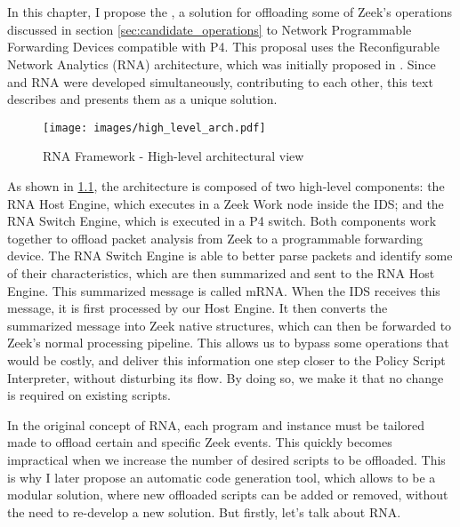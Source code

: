 \chapter{\TheSolutionName{}}
\label{cap:proposal}

In this chapter, I propose the \TheSolutionName{}, a solution for offloading some of Zeek's operations discussed in section \ref{sec:candidate_operations} to Network Programmable Forwarding Devices compatible with P4. This proposal uses the Reconfigurable Network Analytics (RNA) architecture, which was initially proposed in \cite{Ilha2022}. Since \TheSolutionName{} and RNA were developed simultaneously, contributing to each other, this text describes and presents them as a unique solution.

\begin{figure}[h]
    \caption{RNA Framework - High-level architectural view}
    \begin{center}
        \texttt{[image: images/high\_level\_arch.pdf]}  
    \end{center}
    \label{fig:high_level_arch}
\end{figure}

As shown in \figref{} \ref{fig:high_level_arch}, the architecture is composed of two high-level components: the RNA Host Engine, which executes in a Zeek Work node inside the IDS; and the RNA Switch Engine, which is executed in a P4 switch. Both components work together to offload packet analysis from Zeek to a programmable forwarding device. The RNA Switch Engine is able to better parse packets and identify some of their characteristics, which are then summarized and sent to the RNA Host Engine. This summarized message is called mRNA. When the IDS receives this message, it is first processed by our Host Engine. It then converts the summarized message into Zeek native structures, which can then be forwarded to Zeek's normal processing pipeline. This allows us to bypass some operations that would be costly, and deliver this information one step closer to the Policy Script Interpreter, without disturbing its flow. By doing so, we make it that no change is required on existing scripts.

In the original concept of RNA, each program and instance must be tailored made to offload certain and specific Zeek events. This quickly becomes impractical when we increase the number of desired scripts to be offloaded. This is why I later propose an automatic code generation tool, which allows \TheSolutionName{} to be a modular solution, where new offloaded scripts can be added or removed, without the need to re-develop a new solution. But firstly, let's talk about RNA.


